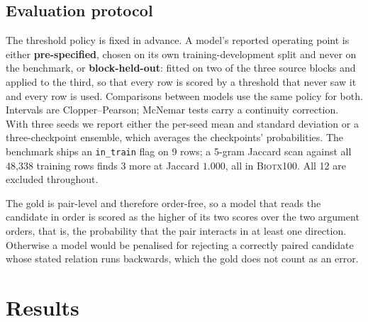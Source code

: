\documentclass[11pt]{article}
\begin{document}
\subsection{Evaluation protocol}
\label{sec:protocol}

The threshold policy is fixed in advance. A model's reported operating point is either
\textbf{pre-specified}, chosen on its own training-development split and never on the benchmark, or
\textbf{block-held-out}: fitted on two of the three source blocks and applied to the third, so that
every row is scored by a threshold that never saw it and every row is used. Comparisons between
models use the same policy for both. Intervals are Clopper--Pearson; McNemar tests
\citep{mcnemar1947note} carry a continuity correction. With three seeds we report either the
per-seed mean and standard deviation or a three-checkpoint ensemble, which averages the checkpoints'
probabilities. The benchmark ships an \texttt{in\_train} flag on 9 rows; a 5-gram Jaccard scan
against all 48{,}338 training rows finds 3 more at Jaccard $1.000$, all in \textsc{Biotx100}. All 12 are
excluded throughout.

The gold is pair-level and therefore order-free, so a model that reads the candidate in order is
scored as the higher of its two scores over the two argument orders, that is, the probability that
the pair interacts in at least one direction. Otherwise a model would be penalised for rejecting a
correctly paired candidate whose stated relation runs backwards, which the gold does not count as an
error.

\section{Results}
\label{sec:results}
\end{document}
